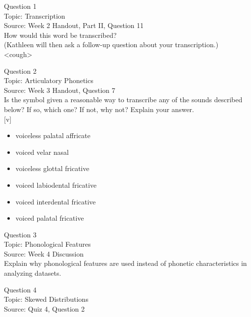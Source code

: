 \documentclass[12pt]{article}
\begin{document}
{\large Question 1}\\

Topic: Transcription\\
Source: Week 2 Handout, Part II, Question 11\\

How would this word be transcribed?\\ (Kathleen will then ask a follow-up question about your transcription.)\\

<cough>


\newpage

{\large Question 2}\\

Topic: Articulatory Phonetics\\
Source: Week 3 Handout, Question 7\\

Is the symbol given a reasonable way to transcribe any of the sounds described below? If so, which one? If not, why not? Explain your answer.\\

{[v]}

\begin{itemize} \item voiceless palatal affricate \item voiced velar nasal \item voiceless glottal fricative \item voiced labiodental fricative \item voiced interdental fricative \item voiced palatal fricative \end{itemize}


\newpage

{\large Question 3}\\

Topic: Phonological Features\\
Source: Week 4 Discussion\\

Explain why phonological features are used instead of phonetic characteristics in analyzing datasets.\\


\newpage

{\large Question 4}\\

Topic: Skewed Distributions\\
Source: Quiz 4, Question 2\\
\end{document}
